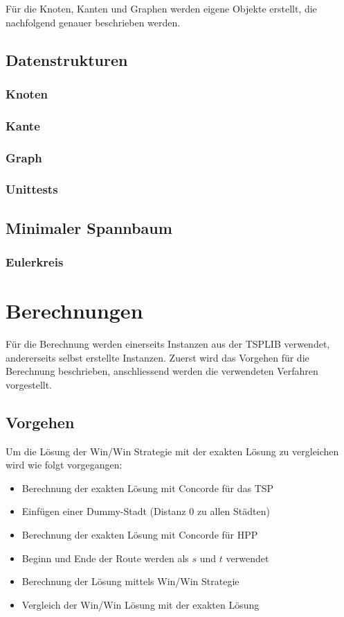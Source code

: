 \documentclass[11pt,a4paper]{article}
\begin{document}
Für die Knoten, Kanten und Graphen werden eigene Objekte erstellt, die nachfolgend genauer beschrieben werden. 

\subsection{Datenstrukturen}
\subsubsection{Knoten}
\subsubsection{Kante}
\subsubsection{Graph}
\subsubsection{Unittests}
\subsection{Minimaler Spannbaum}
\subsubsection{Eulerkreis}

\newpage

\section{Berechnungen}
Für die Berechnung werden einerseits Instanzen aus der TSPLIB verwendet, andererseits selbst erstellte Instanzen.
Zuerst wird das Vorgehen für die Berechnung beschrieben, anschliessend werden die verwendeten Verfahren vorgestellt.


\subsection{Vorgehen}
Um die Lösung der Win/Win Strategie mit der exakten Lösung zu vergleichen wird wie folgt vorgegangen:

\begin{itemize}
    \item Berechnung der exakten Lösung mit Concorde für das TSP 
    \item Einfügen einer Dummy-Stadt (Distanz 0 zu allen Städten)
    \item Berechnung der exakten Lösung mit Concorde für HPP 
    \item Beginn und Ende der Route werden als $s$ und $t$ verwendet
    \item Berechnung der Lösung mittels Win/Win Strategie
    \item Vergleich der Win/Win Lösung mit der exakten Lösung
\end{itemize}
\end{document}
